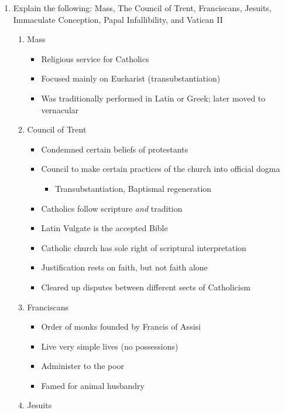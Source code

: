 \documentclass[8pt]{article}
\begin{document}
\begin{enumerate}
    \item Explain the following: Mass, The Council of Trent, Franciscans, Jesuits, Immaculate Conception, Papal Infallibility, and Vatican II
    \begin{enumerate}
        \item Mass
        \begin{itemize}
            \item Religious service for Catholics
            \item Focused mainly on Eucharist (transubstantiation)
            \item Was traditionally performed in Latin or Greek; later moved to vernacular
        \end{itemize}
        \item Council of Trent
        \begin{itemize}
            \item Condemned certain beliefs of protestants
            \item Council to make certain practices of the church into official dogma
            \begin{itemize}
                \item Transubstantiation, Baptismal regeneration
            \end{itemize}
            \item Catholics follow scripture \textit{and} tradition
            \item Latin Vulgate is the accepted Bible
            \item Catholic church has sole right of scriptural interpretation
            \item Justification rests on faith, but not faith alone
            \item Cleared up disputes between different sects of Catholicism
        \end{itemize}
        \item Franciscans
        \begin{itemize}
            \item Order of monks founded by Francis of Assisi
            \item Live very simple lives (no possessions)
            \item Administer to the poor
            \item Famed for animal husbandry
        \end{itemize}
        \item Jesuits
        \begin{itemize}

\end{itemize}
\end{enumerate}
\end{enumerate}
\end{document}
